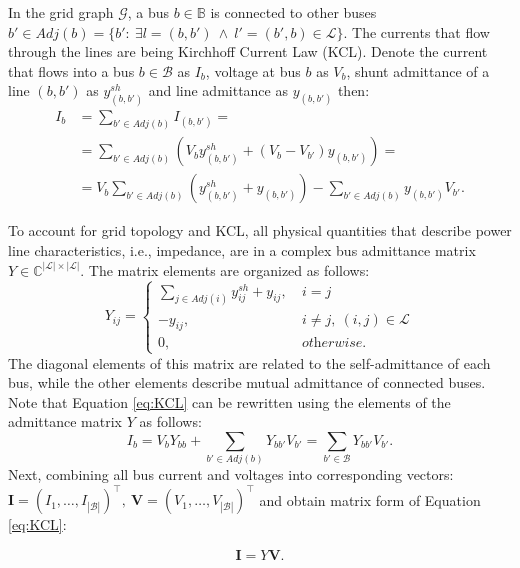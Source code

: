 In the grid graph $\mathcal{G}$, a bus $b \in \mathbb{B}$ is connected to other buses $b' \in \textit{Adj}(b) = \{ b':~ \exists l = (b, b') ~\wedge~l' = (b', b) \in \mathcal{L} \}$.
The currents that flow through the lines are being Kirchhoff Current Law (KCL). 
Denote the current that flows into a bus $b\in \mathcal{B}$ as $I_b$, voltage at bus $b$ as $V_b$, shunt admittance of a line $(b, b')$ as $y^{sh}_{(b, b')}$ and line admittance as $y_{(b, b')}$ then:
\begin{equation}
    \begin{aligned}
        I_b &= \sum_{b' \in \textit{Adj}(b)} I_{(b,b')} = \\
            &= \sum_{b' \in \textit{Adj}(b)} \left( V_b y^{sh}_{(b, b')} + (V_b - V_{b'})y_{(b, b')} \right) = \\
            &= V_b\sum_{b' \in \textit{Adj}(b)} \left( y^{sh}_{(b, b')} + y_{(b, b')} \right) - \sum_{b' \in \textit{Adj}(b)} y_{(b,b')} V_{b'}.
    \end{aligned}
    \label{eq:KCL}
\end{equation}

To account for grid topology and KCL, all physical quantities that describe power line characteristics, i.e., impedance, are in a complex bus admittance matrix $Y \in \mathbb{C}^{|\mathcal{L}| \times |\mathcal{L}|}$. The matrix elements are organized as follows:
$$
Y_{ij} = 
\begin{cases}
\sum_{j \in \textit{Adj}(i)} y^{sh}_{ij} + y_{ij},& ~ i = j \\
-y_{ij},& ~ i \neq j, ~ (i,j) \in \mathcal{L} \\
0, & ~ \textit{otherwise}.
\end{cases}
$$
The diagonal elements of this matrix are related to the self-admittance of each bus, while the other elements describe mutual admittance of connected buses.
Note that Equation \eqref{eq:KCL} can be rewritten using the elements of the admittance matrix $Y$ as follows:
\begin{equation}
    I_b =V_b Y_{bb} + \sum_{b' \in \textit{Adj}(b)} Y_{bb'}V_{b'} = \sum_{b' \in \mathcal{B}} Y_{bb'}V_{b'}.
    \label{eq:current_amd_V}
\end{equation}
Next, combining all bus current and voltages into corresponding vectors: $\boldsymbol{I} = (I_1, \dots, I_{|\mathcal{B}|})^\top, ~ \boldsymbol{V} = (V_1, \dots, V_{|\mathcal{B}|})^\top$ and obtain matrix form of Equation \eqref{eq:KCL}:

\begin{equation}
    \boldsymbol{I} = Y \boldsymbol{V}.
    \label{eq:KCL_matrix}
\end{equation}

